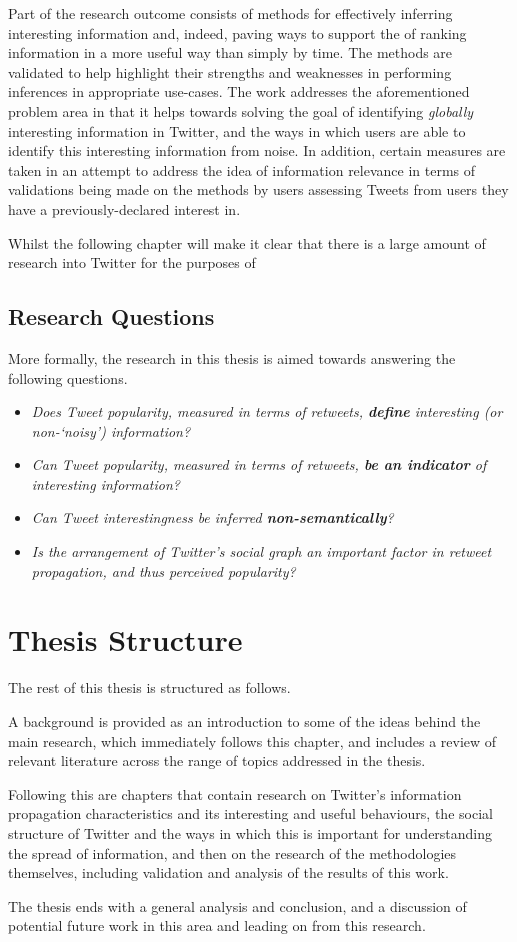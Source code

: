Part of the research outcome consists of methods for effectively inferring interesting information and, indeed, paving ways to support the of ranking information in a more useful way than simply by time. The methods are validated to help highlight their strengths and weaknesses in performing inferences in appropriate use-cases. The work addresses the aforementioned problem area in that it helps towards solving the goal of identifying \textit{globally} interesting information in Twitter, and the ways in which users are able to identify this interesting information from noise. In addition, certain measures are taken in an attempt to address the idea of information relevance in terms of validations being made on the methods by users assessing Tweets from users they have a previously-declared interest in.

Whilst the following chapter will make it clear that there is a large amount of research into Twitter for the purposes of

\subsection{Research Questions}
More formally, the research in this thesis is aimed towards answering the following questions.
\begin{itemize}
    \item \textit{Does Tweet popularity, measured in terms of retweets, \textbf{define} interesting (or non-`noisy') information?}
    \item \textit{Can Tweet popularity, measured in terms of retweets, \textbf{be an indicator} of interesting information?}
    \item \textit{Can Tweet interestingness be inferred \textbf{non-semantically}?}
    \item \textit{Is the arrangement of Twitter's social graph an important factor in retweet propagation, and thus perceived popularity?}
\end{itemize} 



\section{Thesis Structure}
The rest of this thesis is structured as follows.

A background is provided as an introduction to some of the ideas behind the main research, which immediately follows this chapter, and includes a review of relevant literature across the range of topics addressed in the thesis.

Following this are chapters that contain research on Twitter's information propagation characteristics and its interesting and useful behaviours, the social structure of Twitter and the ways in which this is important for understanding the spread of information, and then on the research of the methodologies themselves, including validation and analysis of the results of this work.

The thesis ends with a general analysis and conclusion, and a discussion of potential future work in this area and leading on from this research.
